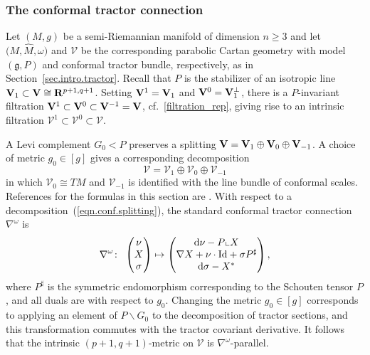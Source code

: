 \documentclass[pdftex]{sigma}
\numberwithin{equation}{section}
\theoremstyle{definition}
\newcommand{\BR}{{\bf R}}
\def\g{{\mathfrak g}}
\begin{document}
\subsubsection{The conformal tractor connection}
\label{sec.conf.tractor}

Let $(M,g)$ be a semi-Riemannian manifold of dimension $n \geq 3$ and let $\bigl(M, \hat{M}, \omega\bigr)$ and $\mathcal{V}$ be the corresponding parabolic Cartan geometry with model $(\g, P)$ and conformal tractor bundle, respectively, as in Section~\ref{sec.intro.tractor}. Recall that $P$ is the stabilizer of an isotropic line ${\bf V}_{1} \subset {\bf V} \cong \BR^{p+1,q+1}$. Setting ${\bf V}^{1} = {\bf V}_{1}$ and {${\bf V}^0 = {\bf V}_{1}^\perp$}, there is a $P$-invariant filtration
${{\bf V}^{1} \subset {\bf V}^0 \subset {\bf V}^{-1} = {\bf V}}$, cf.\ \eqref{filtration_rep}, giving rise to an intrinsic filtration $ \mathcal{V}^{1} \subset \mathcal{V}^0 \subset \mathcal{V}$.

A Levi complement $G_0 < P$ preserves a splitting ${\bf V} = {\bf V}_{1} \oplus {\bf V}_0 \oplus {\bf V}_{-1}$.
A choice of metric $g_0 \in [g]$ gives a corresponding decomposition
\begin{equation}
\label{eqn.conf.splitting}
\mathcal{V} = \mathcal{V}_{1} \oplus \mathcal{V}_0 \oplus \mathcal{V}_{-1}
\end{equation}
in which $\mathcal{V}_0 \cong TM$ and $\mathcal{V}_{-1}$ is identified with the line bundle of conformal scales.
References for the formulas in this section are \cite[equations~(22) and~(32)]{curry.gover.tractors}.
With respect to a decomposition~(\ref{eqn.conf.splitting}), the standard conformal tractor connection $\nabla^\omega$ is
\begin{equation}
\label{eqn.conf.connxn}
 \nabla^\omega \colon\ \begin{pmatrix} \nu \\ X \\ \sigma \end{pmatrix} \mapsto \begin{pmatrix} {\rm d} \nu - P \llcorner X \\ \nabla X + \nu \cdot {\rm Id} + \sigma P^\sharp \\ {\rm d} \sigma - X^* \end{pmatrix},
 \end{equation}
where $P^\sharp$ is the symmetric endomorphism corresponding to the Schouten tensor $P$, and all duals are with respect to $g_0$. Changing the metric $g_0 \in [g]$ corresponds to applying an element of $P \backslash G_0$ to the decomposition of tractor sections, and this transformation commutes with the tractor covariant derivative.
It follows that the intrinsic $(p+1,q+1)$-metric on $\mathcal{V}$ is $\nabla^\omega$-parallel.
\end{document}
